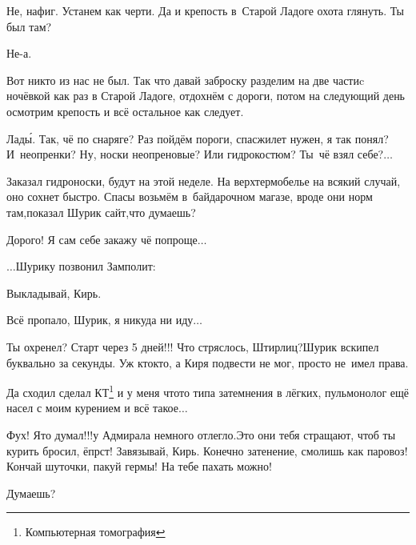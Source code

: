 \diagdash Не, нафиг. Устанем как черти. Да и крепость в~Старой Ладоге охота глянуть. Ты был там?

\diagdash Не-а.

\diagdash Вот никто из нас не был. Так что давай заброску разделим на две части\mdash c ночёвкой как раз в Старой Ладоге, отдохнём с дороги, потом на следующий день осмотрим крепость и всё остальное как следует.

\diagdash Лад\'{ы}. Так, чё по снаряге? Раз пойдём пороги, спасжилет нужен, я так понял? И~неопренки? Ну, носки неопреновые? Или гидрокостюм? Ты~чё взял себе?$\ldots$

\diagdash Заказал гидроноски, будут на этой неделе. На верх\mdash термобелье на всякий случай, оно сохнет быстро. Спасы возьмём в~байдарочном магазе, вроде они норм там,\mdash показал Шурик сайт,\mdash что думаешь?

\diagdash Дорого! Я сам себе закажу чё попроще$\ldots$




\vspace{0.4cm}
$\ldots$Шурику позвонил Замполит:

\diagdash Выкладывай, Кирь.

\diagdash Всё пропало, Шурик, я никуда ни иду$\ldots$

\diagdash Ты охренел? Старт через 5 дней!!! Что стряслось, Штирлиц?\mdash Шурик вскипел буквально за секунды. Уж кто\sdash кто, а Киря подвести не мог, просто не~имел права. 

\diagdash Да сходил сделал КТ\footnote{Компьютерная томография} и у меня что\sdash то типа затемнения в лёгких, пульмонолог ещё насел с моим курением и всё такое$\ldots$

\diagdash Фух! Я\sdash то думал!!!\mdash у Адмирала немного отлегло.\mdash Это они тебя стращают, чтоб ты курить бросил, ёпрст! Завязывай, Кирь. Конечно затенение, смолишь как паровоз! Кончай шуточки, пакуй гермы! На тебе пахать можно!

\diagdash Думаешь?

